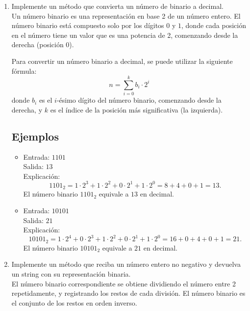 \begin{enumerate}[label=\alph*)]
    \item Implemente un método que convierta un número de binario a decimal.\\
    Un número binario es una representación en base 2 de un número entero. El número binario está compuesto solo por los dígitos \(0\) y \(1\), donde cada posición en el número tiene un valor que es una potencia de 2, comenzando desde la derecha (posición 0).

    Para convertir un número binario a decimal, se puede utilizar la siguiente fórmula:
    \[
    n = \sum_{i=0}^{k} b_i \cdot 2^i
    \]
    donde \(b_i\) es el \(i\)-ésimo dígito del número binario, comenzando desde la derecha, y \(k\) es el índice de la posición más significativa (la izquierda).

    \subsection*{Ejemplos}
    \begin{itemize}
        \item Entrada: \( \text{1101} \) \\
        Salida: \( 13 \) \\
        Explicación:
        \[
        1101_2 = 1 \cdot 2^3 + 1 \cdot 2^2 + 0 \cdot 2^1 + 1 \cdot 2^0 = 8 + 4 + 0 + 1 = 13.
        \]
        El número binario \(1101_2\) equivale a \(13\) en decimal.

        \item Entrada: \( \text{10101} \) \\
        Salida: \( 21 \) \\
        Explicación:
        \[
        10101_2 = 1 \cdot 2^4 + 0 \cdot 2^3 + 1 \cdot 2^2 + 0 \cdot 2^1 + 1 \cdot 2^0 = 16 + 0 + 4 + 0 + 1 = 21.
        \]
        El número binario \(10101_2\) equivale a \(21\) en decimal.
    \end{itemize}

    \item Implemente un método que reciba un número entero no negativo y devuelva un string con su representación binaria.\\
    El número binario correspondiente se obtiene dividiendo el número entre 2 repetidamente, y registrando los restos de cada división. El número binario es el conjunto de los restos en orden inverso.


\end{enumerate}
